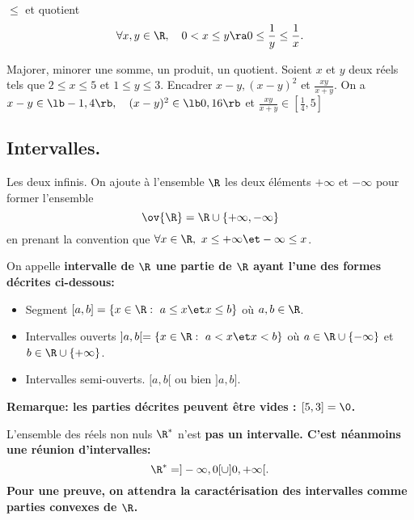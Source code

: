 \documentclass[11pt]{article}
\begin{document}
\begin{rappel}{$\leq$ et quotient}{}
    \begin{equation*}
        \forall x,y\in\R,\quad 0<x\leq y \ra 0\leq\frac{1}{y}\leq\frac{1}{x}.
    \end{equation*}
\end{rappel}

\begin{ex}{Majorer, minorer une somme, un produit, un quotient.}{}
    Soient $x$ et $y$ deux réels tels que $2\leq x\leq 5$ et $1 \leq y \leq 3$. Encadrer $x-y,(x-y)^2$ et \Large $\frac{xy}{x+y}$.
    \tcblower
    On a $x-y\in\lb-1,4\rb, \quad (x-y)^2\in\lb0,16\rb$ et \Large$\frac{xy}{x+y}$\normalsize$\in\left[\frac{1}{4},5\right]$
\end{ex}

\subsection{Intervalles.}

\begin{defi}{Les deux infinis.}{}
    On ajoute à l'ensemble $\R$ les deux éléments $+\infty$ et $-\infty$ pour former l'ensemble
    \begin{equation*}
        \ov{\R}=\R\cup\{+\infty,-\infty\}
    \end{equation*}
    en prenant la convention que $\forall x\in\R,~ x\leq+\infty\et-\infty\leq x$.
\end{defi}

\begin{defi}{}{}
    On appelle \bf{intervalle} de $\R$ une partie de $\R$ ayant l'une des formes décrites ci-dessous:
    \begin{itemize}
        \item Segment $[a,b]=\{x\in\R:~a\leq x\et x\leq b\}$ où $a,b\in\R$.
        \item Intervalles ouverts $]a,b[=\{x\in\R:~a<x\et x<b\}$ où $a\in\R\cup\{-\infty\}$ et $b\in\R\cup\{+\infty\}$.
        \item Intervalles semi-ouverts. $[a,b[$ ou bien $]a,b]$.
    \end{itemize}
    \bf{Remarque:} les parties décrites peuvent être vides : $[5,3]=\0$.
\end{defi}

\begin{ex}{}{}
    L'ensemble des réels non nuls $\R^*$ n'est \bf{pas} un intervalle. C'est néanmoins une réunion d'intervalles:
    \begin{equation*}
        \R^*=]-\infty,0[\cup]0,+\infty[.
    \end{equation*}
    Pour une preuve, on attendra la caractérisation des intervalles comme parties convexes de $\R$.
\end{ex}
\end{document}
